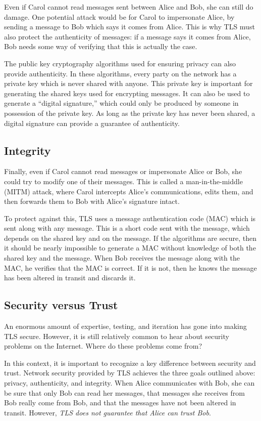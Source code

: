 Even if Carol cannot read messages sent between Alice and Bob, she can still do damage. One potential attack would be for Carol to impersonate Alice, by sending a message to Bob which says it comes from Alice. This is why TLS must also protect the authenticity of messages: if a message says it comes from Alice, Bob needs some way of verifying that this is actually the case.

The public key cryptography algorithms used for ensuring privacy can also provide authenticity. In these algorithms, every party on the network has a private key which is never shared with anyone. This private key is important for generating the shared keys used for encrypting messages. It can also be used to generate a ``digital signature,'' which could only be produced by someone in possession of the private key. As long as the private key has never been shared, a digital signature can provide a guarantee of authenticity.

\subsection{Integrity}

Finally, even if Carol cannot read messages or impersonate Alice or Bob, she could try to modify one of their messages. This is called a man-in-the-middle (MITM) attack, where Carol intercepts Alice's communications, edits them, and then forwards them to Bob with Alice's signature intact.

To protect against this, TLS uses a message authentication code (MAC) which is sent along with any message. This is a short code sent with the message, which depends on the shared key and on the message. If the algorithms are secure, then it should be nearly impossible to generate a MAC without knowledge of both the shared key and the message. When Bob receives the message along with the MAC, he verifies that the MAC is correct. If it is not, then he knows the message has been altered in transit and discards it.

\subsection{Security versus Trust}

An enormous amount of expertise, testing, and iteration has gone into making TLS secure. However, it is still relatively common to hear about security problems on the Internet. Where do these problems come from?

In this context, it is important to recognize a key difference between security and trust. Network security provided by TLS achieves the three goals outlined above: privacy, authenticity, and integrity. When Alice communicates with Bob, she can be sure that only Bob can read her messages, that messages she receives from Bob really come from Bob, and that the messages have not been altered in transit. However, \emph{TLS does not guarantee that Alice can trust Bob}.

